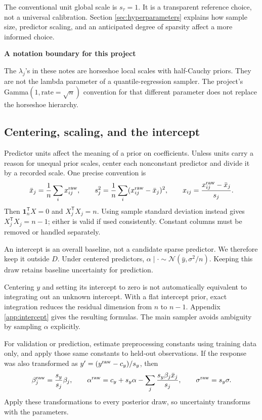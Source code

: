 \documentclass[11pt,letterpaper]{article}
\numberwithin{equation}{section}
\newcommand{\Normal}{\mathcal{N}}
\newcommand{\given}{\mid}
\newcommand{\ones}{\mathbf{1}}
\newcommand{\trans}{^{\mathsf T}}
\newcommand{\key}[1]{\par\smallskip\textbf{#1}\par\smallskip}
\begin{document}
The conventional unit global scale is \(s_\tau=1\). It is a transparent
reference choice, not a universal calibration. Section \ref{sec:hyperparameters}
explains how sample size, predictor scaling, and an anticipated degree of
sparsity affect a more informed choice.

\key{A notation boundary for this project}
The \(\lambda_j\)'s in these notes are horseshoe local scales with half-Cauchy
priors. They are not the lambda parameter of a quantile-regression sampler.
The project's Gamma\((1,\text{rate}=\sqrt n)\) convention for that different
parameter does not replace the horseshoe hierarchy.

\subsection{Centering, scaling, and the intercept}

Predictor units affect the meaning of a prior on coefficients. Unless units
carry a reason for unequal prior scales, center each nonconstant predictor and
divide it by a recorded scale. One precise convention is
\begin{equation}\label{eq:standardize}
 \bar x_j=\frac1n\sum_i x_{ij}^{\rm raw},\qquad
 s_j^2=\frac1n\sum_i(x_{ij}^{\rm raw}-\bar x_j)^2,\qquad
 x_{ij}=\frac{x_{ij}^{\rm raw}-\bar x_j}{s_j}.
\end{equation}
Then \(\ones_n\trans X=0\) and \(X_j\trans X_j=n\). Using sample standard
deviation instead gives \(X_j\trans X_j=n-1\); either is valid if used
consistently. Constant columns must be removed or handled separately.

An intercept is an overall baseline, not a candidate sparse predictor. We
therefore keep it outside \(D\). Under centered predictors,
\(\alpha\given\cdot\sim\Normal(\bar y,\sigma^2/n)\). Keeping this draw
retains baseline uncertainty for prediction.

Centering \(y\) and setting its intercept to zero is not automatically
equivalent to integrating out an unknown intercept. With a flat intercept
prior, exact integration reduces the residual dimension from \(n\) to
\(n-1\). Appendix \ref{app:intercept} gives the resulting formulas. The main
sampler avoids ambiguity by sampling \(\alpha\) explicitly.

For validation or prediction, estimate preprocessing constants using training
data only, and apply those same constants to held-out observations. If the
response was also transformed as \(y'=(y^{\rm raw}-c_y)/s_y\), then
\begin{equation}\label{eq:backtransform}
 \beta_j^{\rm raw}=\frac{s_y}{s_j}\beta_j,\qquad
 \alpha^{\rm raw}=c_y+s_y\alpha-
       \sum_j\frac{s_y\beta_j\bar x_j}{s_j},\qquad
 \sigma^{\rm raw}=s_y\sigma.
\end{equation}
Apply these transformations to every posterior draw, so uncertainty transforms
with the parameters.
\end{document}
